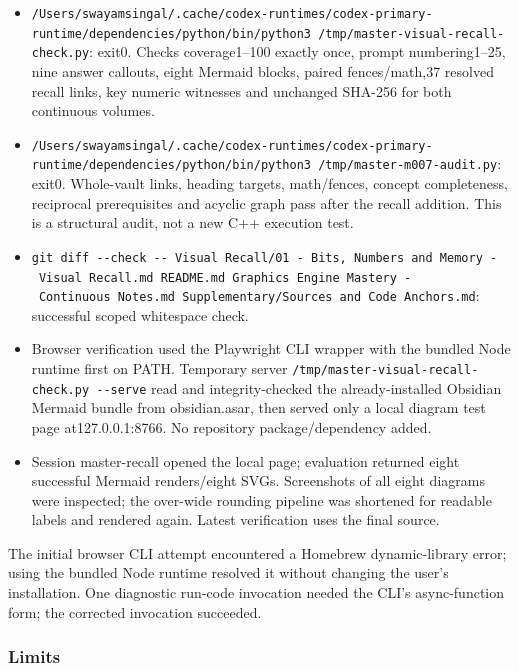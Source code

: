 \begin{itemize}
\tightlist
\item
  \texttt{/Users/swayamsingal/.cache/codex-runtimes/codex-primary-runtime/dependencies/python/bin/python3\ /tmp/master-visual-recall-check.py}: exit0. Checks coverage1--100 exactly once, prompt numbering1--25, nine answer callouts, eight Mermaid blocks, paired fences/math,37 resolved recall links, key numeric witnesses and unchanged SHA-256 for both continuous volumes.
\item
  \texttt{/Users/swayamsingal/.cache/codex-runtimes/codex-primary-runtime/dependencies/python/bin/python3\ /tmp/master-m007-audit.py}: exit0. Whole-vault links, heading targets, math/fences, concept completeness, reciprocal prerequisites and acyclic graph pass after the recall addition. This is a structural audit, not a new C++ execution test.
\item
  \texttt{git\ diff\ -\/-check\ -\/-\ \textquotesingle{}Visual\ Recall/01\ -\ Bits,\ Numbers\ and\ Memory\ -\ Visual\ Recall.md\textquotesingle{}\ README.md\ \textquotesingle{}Graphics\ Engine\ Mastery\ -\ Continuous\ Notes.md\textquotesingle{}\ \textquotesingle{}Supplementary/Sources\ and\ Code\ Anchors.md\textquotesingle{}}: successful scoped whitespace check.
\item
  Browser verification used the Playwright CLI wrapper with the bundled Node runtime first on PATH. Temporary server \texttt{/tmp/master-visual-recall-check.py\ -\/-serve} read and integrity-checked the already-installed Obsidian Mermaid bundle from obsidian.asar, then served only a local diagram test page at127.0.0.1:8766. No repository package/dependency added.
\item
  Session master-recall opened the local page; evaluation returned eight successful Mermaid renders/eight SVGs. Screenshots of all eight diagrams were inspected; the over-wide rounding pipeline was shortened for readable labels and rendered again. Latest verification uses the final source.
\end{itemize}

The initial browser CLI attempt encountered a Homebrew dynamic-library error; using the bundled Node runtime resolved it without changing the user's installation. One diagnostic run-code invocation needed the CLI's async-function form; the corrected invocation succeeded.

\subsubsection{Limits}\label{appendix-a103e7846d21-limits}

